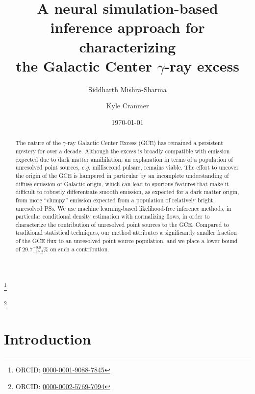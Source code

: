\documentclass[prd,aps,10pt,nofootinbib,twocolumn,superscriptaddress,preprintnumbers,balancelastpage,longbibliography]{revtex4-1}
\begin{document}
\title{A neural simulation-based inference approach for characterizing \\ the Galactic Center $\gamma$-ray excess}
 
\author{Siddharth Mishra-Sharma}
\thanks{ORCID: \href{https://orcid.org/0000-0001-9088-7845}{0000-0001-9088-7845}}

\author{Kyle Cranmer}
\thanks{ORCID: \href{https://orcid.org/0000-0002-5769-7094}{0000-0002-5769-7094}}

\date{\today}

\begin{abstract}
The nature of the \Fermi $\gamma$-ray Galactic Center Excess (GCE) has remained a persistent mystery for over a decade. Although the excess is broadly compatible with emission expected due to dark matter annihilation, an explanation in terms of a population of unresolved point sources, \emph{e.g.} millisecond pulsars, remains viable. The effort to uncover the origin of the GCE is hampered in particular by an incomplete understanding of diffuse emission of Galactic origin, which can lead to spurious features that make it difficult to robustly differentiate smooth emission, as expected for a dark matter origin, from more ``clumpy'' emission expected from a population of relatively bright, unresolved PSs. We use machine learning-based likelihood-free inference methods, in particular conditional density estimation with normalizing flows, in order to characterize the contribution of unresolved point sources to the GCE. Compared to traditional statistical techniques, our method attributes a significantly smaller fraction of the GCE flux to an unresolved point source population, and we place a lower bound of $29.7^{+9.8}_{-17.2}\%$ on such a contribution.
\end{abstract}

\maketitle

\section{Introduction}
\label{sec:intro}
\end{document}
